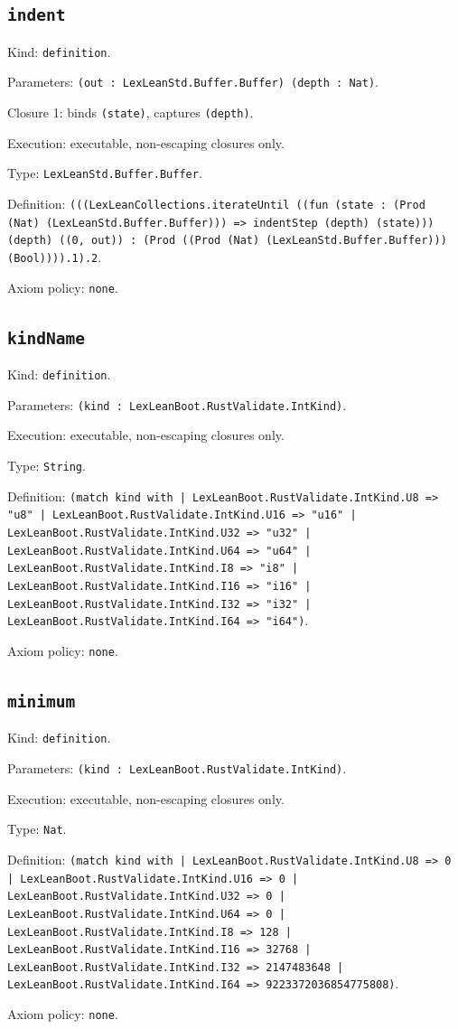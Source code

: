 \documentclass[11pt]{article}
\begin{document}
\subsection*{\texttt{indent}}
\noindent Kind: \texttt{definition}.\par
\noindent Parameters: \texttt{(out : LexLeanStd.Buffer.Buffer) (depth : Nat)}.\par
\noindent Closure 1: binds \texttt{(state)}, captures \texttt{(depth)}.\par
\noindent Execution: executable, non-escaping closures only.\par
\noindent Type: \texttt{LexLeanStd.Buffer.Buffer}.\par
\noindent Definition: \texttt{(((LexLeanCollections.iterateUntil ((fun (state : (Prod (Nat) (LexLeanStd.Buffer.Buffer))) => indentStep (depth) (state))) (depth) ((0, out)) : (Prod ((Prod (Nat) (LexLeanStd.Buffer.Buffer))) (Bool)))).1).2}.\par
\noindent Axiom policy: \texttt{none}.\par
\subsection*{\texttt{kindName}}
\noindent Kind: \texttt{definition}.\par
\noindent Parameters: \texttt{(kind : LexLeanBoot.RustValidate.IntKind)}.\par
\noindent Execution: executable, non-escaping closures only.\par
\noindent Type: \texttt{String}.\par
\noindent Definition: \texttt{(match kind with | LexLeanBoot.RustValidate.IntKind.U8 => "u8" | LexLeanBoot.RustValidate.IntKind.U16 => "u16" | LexLeanBoot.RustValidate.IntKind.U32 => "u32" | LexLeanBoot.RustValidate.IntKind.U64 => "u64" | LexLeanBoot.RustValidate.IntKind.I8 => "i8" | LexLeanBoot.RustValidate.IntKind.I16 => "i16" | LexLeanBoot.RustValidate.IntKind.I32 => "i32" | LexLeanBoot.RustValidate.IntKind.I64 => "i64")}.\par
\noindent Axiom policy: \texttt{none}.\par
\subsection*{\texttt{minimum}}
\noindent Kind: \texttt{definition}.\par
\noindent Parameters: \texttt{(kind : LexLeanBoot.RustValidate.IntKind)}.\par
\noindent Execution: executable, non-escaping closures only.\par
\noindent Type: \texttt{Nat}.\par
\noindent Definition: \texttt{(match kind with | LexLeanBoot.RustValidate.IntKind.U8 => 0 | LexLeanBoot.RustValidate.IntKind.U16 => 0 | LexLeanBoot.RustValidate.IntKind.U32 => 0 | LexLeanBoot.RustValidate.IntKind.U64 => 0 | LexLeanBoot.RustValidate.IntKind.I8 => 128 | LexLeanBoot.RustValidate.IntKind.I16 => 32768 | LexLeanBoot.RustValidate.IntKind.I32 => 2147483648 | LexLeanBoot.RustValidate.IntKind.I64 => 9223372036854775808)}.\par
\noindent Axiom policy: \texttt{none}.\par
\end{document}
